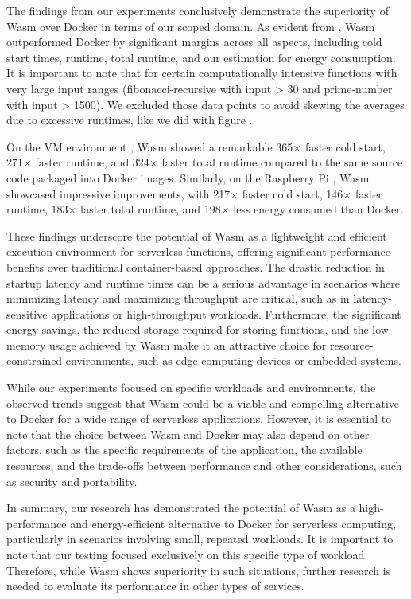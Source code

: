 \documentclass[
  table]{report}
\begin{document}
The findings from our experiments conclusively demonstrate the
superiority of \ac{Wasm} over Docker in terms of our scoped domain. As
evident from , Wasm outperformed Docker
by significant margins across all aspects, including cold start times,
runtime, total runtime, and our estimation for energy consumption. It is
important to note that for certain computationally intensive functions
with very large input ranges (fibonacci-recursive with input
\textgreater{} 30 and prime-number with input \textgreater{} 1500). We
excluded those data points to avoid skewing the averages due to
excessive runtimes, like we did with figure
.

On the VM environment , Wasm showed a remarkable 365×
faster cold start, 271× faster runtime, and 324× faster total runtime
compared to the same source code packaged into Docker images. Similarly,
on the Raspberry Pi , Wasm showcased impressive
improvements, with 217× faster cold start, 146× faster runtime, 183×
faster total runtime, and 198× less energy consumed than Docker.

These findings underscore the potential of Wasm as a lightweight and
efficient execution environment for serverless functions, offering
significant performance benefits over traditional container-based
approaches. The drastic reduction in startup latency and runtime times
can be a serious advantage in scenarios where minimizing latency and
maximizing throughput are critical, such as in latency-sensitive
applications or high-throughput workloads. Furthermore, the significant
energy savings, the reduced storage required for storing functions, and
the low memory usage \citep{shillakerFaasmLightweightIsolation2020a}
achieved by \ac{Wasm} make it an attractive choice for
resource-constrained environments, such as edge computing devices or
embedded systems.

While our experiments focused on specific workloads and environments,
the observed trends suggest that Wasm could be a viable and compelling
alternative to Docker for a wide range of serverless applications.
However, it is essential to note that the choice between Wasm and Docker
may also depend on other factors, such as the specific requirements of
the application, the available resources, and the trade-offs between
performance and other considerations, such as security and portability.

In summary, our research has demonstrated the potential of Wasm as a
high-performance and energy-efficient alternative to Docker for
serverless computing, particularly in scenarios involving small,
repeated workloads. It is important to note that our testing focused
exclusively on this specific type of workload. Therefore, while Wasm
shows superiority in such situations, further research is needed to
evaluate its performance in other types of services.
\end{document}
